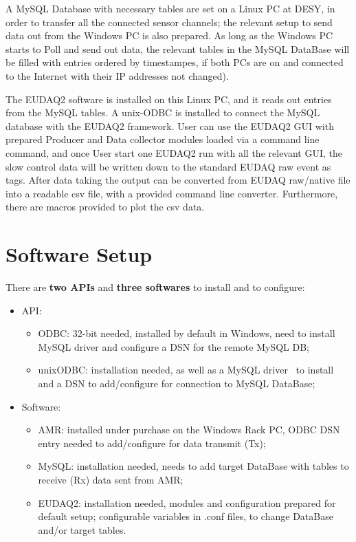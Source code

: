 \documentclass[a4paper,12pt]{scrartcl}
\begin{document}
A MySQL Database with necessary tables are set on a Linux PC at DESY, in order to transfer all the connected sensor channels; the relevant setup to send data out from the Windows PC is also prepared. As long as the Windows PC starts to Poll and send out data, the relevant tables in the MySQL DataBase will be filled with entries ordered by timestampes, if both PCs are on and connected to the Internet with their IP addresses not changed).

The EUDAQ2 software is installed on this Linux PC, and it reads out entries from the MySQL tables.
A unix-ODBC is installed to connect the MySQL database with the EUDAQ2 framework.
User can use the EUDAQ2 GUI with prepared Producer and Data collector modules loaded via a command line command, and once User start one EUDAQ2 run with all the relevant GUI, the slow control data will be written down to the standard EUDAQ raw event as tags.
After data taking the output can be converted from EUDAQ raw/native file into a readable csv file, with a provided command line converter. Furthermore, there are macros provided to plot the csv data.

\section{Software Setup} \label{sec:swsetup}
There are \textbf{two APIs} and \textbf{three softwares} to install and to configure:
\begin{itemize}
  \item API:
  \begin{itemize}
    \item ODBC: 32-bit needed, installed by default in Windows, need to install MySQL driver and configure a DSN for the remote MySQL DB;
    \item unixODBC: installation needed, as well as a MySQL driver~\cite{mysql-odbc} to install and a DSN to add/configure for connection to MySQL DataBase;
  \end{itemize}

  \item Software:
  \begin{itemize}
    \item AMR: installed under purchase on the Windows Rack PC, ODBC DSN entry needed to add/configure for data transmit (Tx);
    \item MySQL: installation needed, needs to add target DataBase with tables to receive (Rx) data sent from AMR;
    \item EUDAQ2: installation needed, modules and configuration prepared for default setup; configurable variables in .conf files, to change DataBase and/or target tables.
  \end{itemize}
\end{itemize}
\end{document}
